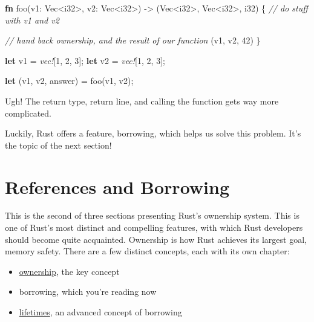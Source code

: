 \documentclass[a4paper,]{book}
\newenvironment{Shaded}{\begin{snugshade}}{\end{snugshade}}
\newcommand{\KeywordTok}[1]{\textcolor[rgb]{0.13,0.29,0.53}{\textbf{{#1}}}}
\newcommand{\DataTypeTok}[1]{\textcolor[rgb]{0.13,0.29,0.53}{{#1}}}
\newcommand{\DecValTok}[1]{\textcolor[rgb]{0.00,0.00,0.81}{{#1}}}
\newcommand{\CommentTok}[1]{\textcolor[rgb]{0.56,0.35,0.01}{\textit{{#1}}}}
\newcommand{\PreprocessorTok}[1]{\textcolor[rgb]{0.56,0.35,0.01}{\textit{{#1}}}}
\newcommand{\NormalTok}[1]{{#1}}
\providecommand{\tightlist}{%
  \setlength{\itemsep}{0pt}\setlength{\parskip}{0pt}}
\begin{document}
\begin{Shaded}
\begin{Highlighting}[]
\KeywordTok{fn} \NormalTok{foo(v1: }\DataTypeTok{Vec}\NormalTok{<}\DataTypeTok{i32}\NormalTok{>, v2: }\DataTypeTok{Vec}\NormalTok{<}\DataTypeTok{i32}\NormalTok{>) -> (}\DataTypeTok{Vec}\NormalTok{<}\DataTypeTok{i32}\NormalTok{>, }\DataTypeTok{Vec}\NormalTok{<}\DataTypeTok{i32}\NormalTok{>, }\DataTypeTok{i32}\NormalTok{) \{}
    \CommentTok{// do stuff with v1 and v2}

    \CommentTok{// hand back ownership, and the result of our function}
    \NormalTok{(v1, v2, }\DecValTok{42}\NormalTok{)}
\NormalTok{\}}

\KeywordTok{let} \NormalTok{v1 = }\PreprocessorTok{vec!}\NormalTok{[}\DecValTok{1}\NormalTok{, }\DecValTok{2}\NormalTok{, }\DecValTok{3}\NormalTok{];}
\KeywordTok{let} \NormalTok{v2 = }\PreprocessorTok{vec!}\NormalTok{[}\DecValTok{1}\NormalTok{, }\DecValTok{2}\NormalTok{, }\DecValTok{3}\NormalTok{];}

\KeywordTok{let} \NormalTok{(v1, v2, answer) = foo(v1, v2);}
\end{Highlighting}
\end{Shaded}

Ugh! The return type, return line, and calling the function gets way
more complicated.

Luckily, Rust offers a feature, borrowing, which helps us solve this
problem. It's the topic of the next section!

\hypertarget{sec--references-and-borrowing}{\section{References and
Borrowing}\label{sec--references-and-borrowing}}

This is the second of three sections presenting Rust's ownership system.
This is one of Rust's most distinct and compelling features, with which
Rust developers should become quite acquainted. Ownership is how Rust
achieves its largest goal, memory safety. There are a few distinct
concepts, each with its own chapter:

\begin{itemize}
\tightlist
\item
  \protect\hyperlink{sec--ownership}{ownership}, the key concept
\item
  borrowing, which you're reading now
\item
  \protect\hyperlink{sec--lifetimes}{lifetimes}, an advanced concept of
  borrowing
\end{itemize}
\end{document}
